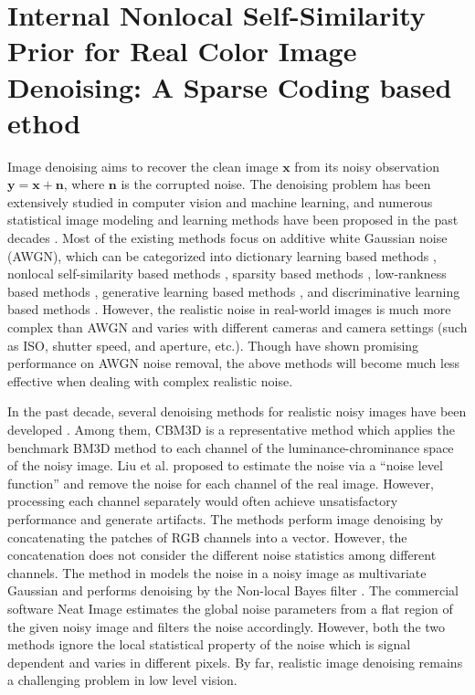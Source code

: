 %
\chapter{Internal Nonlocal Self-Similarity Prior for Real Color Image Denoising: A Sparse Coding based ethod}
\label{sec:internalsc}

Image denoising aims to recover the clean image $\bm{x}$ from its noisy observation $\bm{y}=\bm{x}+\bm{n}$, where $\bm{n}$ is the corrupted noise. The denoising problem has been extensively studied in computer vision and machine learning, and numerous statistical image modeling and learning methods have been proposed in the past decades \cite{ksvd,bm3d,cbm3d,lssc,ncsr,wnnm,epll,pgpd,mlp,csf,chen2015learning,dncnn,
Liu2008,noiseclinic,Zhu_2016_CVPR,crosschannel2016,neatimage}. Most of the existing methods \cite{ksvd,bm3d,cbm3d,lssc,ncsr,wnnm,epll,pgpd,mlp,csf,chen2015learning,dncnn} focus on additive white Gaussian noise (AWGN), which can be categorized into dictionary learning based methods \cite{ksvd}, nonlocal self-similarity based methods \cite{bm3d,cbm3d,lssc,ncsr,wnnm}, sparsity based methods \cite{ksvd,bm3d,cbm3d,lssc,ncsr}, low-rankness based methods \cite{wnnm}, generative learning based methods \cite{epll,pgpd}, and discriminative learning based methods \cite{mlp,csf,chen2015learning,dncnn}. However, the realistic noise in real-world images is much more complex than AWGN \cite{crosschannel2016} and varies with different cameras and camera settings (such as ISO, shutter speed, and aperture, etc.). Though have shown promising performance on AWGN noise removal, the above methods \cite{ksvd,bm3d,cbm3d,lssc,ncsr,wnnm,epll,pgpd,mlp,csf,chen2015learning,dncnn} will become much less effective when dealing with complex realistic noise.

In the past decade, several denoising methods for realistic noisy images have been developed \cite{cbm3d,Liu2008,noiseclinic,Zhu_2016_CVPR,
crosschannel2016,neatimage}. Among them, CBM3D \cite{cbm3d} is a representative method which applies the benchmark BM3D method \cite{bm3d} to each channel of the luminance-chrominance space of the noisy image. Liu et al. \cite{Liu2008} proposed to estimate the noise via a ``noise level function'' and remove the noise for each channel of the real image. However, processing each channel separately would often achieve unsatisfactory performance and generate artifacts. The methods \cite{noiseclinic,Zhu_2016_CVPR} perform image denoising by concatenating the patches of RGB channels into a vector. However, the concatenation does not consider the different noise statistics among different channels. The method in \cite{crosschannel2016} models the noise in a noisy image as multivariate Gaussian and performs denoising by the Non-local Bayes filter \cite{noiseclinic}. The commercial software Neat Image \cite{neatimage} estimates the global noise parameters from a flat region of the given noisy image and filters the noise accordingly. However, both the two methods \cite{crosschannel2016,neatimage} ignore the local statistical property of the noise which is signal dependent and varies in different pixels. By far, realistic image denoising remains a challenging problem in low level vision.  

